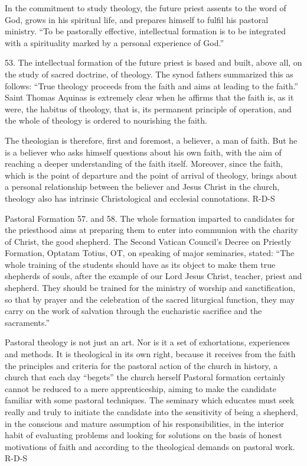 \documentclass[oneside]{book}
\begin{document}
In the commitment to study theology, the future priest assents to the word of
God, grows in his spiritual life, and prepares himself to fulfil his pastoral
ministry. ``To be pastorally effective, intellectual formation is to be
integrated with a spirituality marked by a personal experience of God.''

53. The intellectual formation of the future priest is based and built, above
all, on the study of sacred doctrine, of theology. The synod fathers summarized
this as follows: ``True theology proceeds from the faith and aims at leading to
the faith.'' Saint Thomas Aquinas is extremely clear when he affirms that the
faith is, as it were, the habitus of theology, that is, its permanent principle
of operation, and the whole of theology is ordered to nourishing the faith.

The theologian is therefore, first and foremost, a believer, a man of faith. But
he is a believer who asks himself questions about his own faith, with the aim of
reaching a deeper understanding of the faith itself. Moreover, since the faith,
which is the point of departure and the point of arrival of theology, brings
about a personal relationship between the believer and Jesus Christ in the
church, theology also has intrinsic Christological and ecclesial connotations.
R-D-S

Pastoral Formation
57. and 58. The whole formation imparted to candidates for the priesthood aims
at preparing them to enter into communion with the charity of Christ, the good
shepherd. The Second Vatican Council's Decree on Priestly Formation, Optatam
Totius, OT, on speaking of major seminaries, stated: ``The whole training of the
students should have as its object to make them true shepherds of souls, after
the example of our Lord Jesus Christ, teacher, priest and shepherd. They should
be trained for the ministry of worship and sanctification, so that by prayer and
the celebration of the sacred liturgical function, they may carry on the work of
salvation through the eucharistic sacrifice and the sacraments.''

Pastoral theology is not just an art. Nor is it a set of exhortations,
experiences and methods. It is theological in its own right, because it receives
from the faith the principles and criteria for the pastoral action of the church
in history, a church that each day ``begets'' the church herself
Pastoral formation certainly cannot be reduced to a mere apprenticeship, aiming
to make the candidate familiar with some pastoral techniques. The seminary which
educates must seek really and truly to initiate the candidate into the
sensitivity of being a shepherd, in the conscious and mature assumption of his
responsibilities, in the interior habit of evaluating problems and looking for
solutions on the basis of honest motivations of faith and according to the
theological demands on pastoral work.
R-D-S
\end{document}
